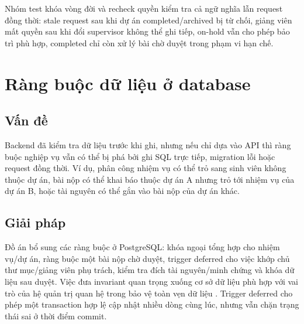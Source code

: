 Nhóm test khóa vòng đời và recheck quyền kiểm tra cả ngữ nghĩa lẫn request đồng thời: stale request sau khi dự án completed/archived bị từ chối, giảng viên mất quyền sau khi đổi supervisor không thể ghi tiếp, on-hold vẫn cho phép bảo trì phù hợp, completed chỉ còn xử lý bài chờ duyệt trong phạm vi hạn chế.

\section{Ràng buộc dữ liệu ở database}

\subsection{Vấn đề}

Backend đã kiểm tra dữ liệu trước khi ghi, nhưng nếu chỉ dựa vào API thì ràng buộc nghiệp vụ vẫn có thể bị phá bởi ghi SQL trực tiếp, migration lỗi hoặc request đồng thời. Ví dụ, phân công nhiệm vụ có thể trỏ sang sinh viên không thuộc dự án, bài nộp có thể khai báo thuộc dự án A nhưng trỏ tới nhiệm vụ của dự án B, hoặc tài nguyên có thể gắn vào bài nộp của dự án khác.

\subsection{Giải pháp}

Đồ án bổ sung các ràng buộc ở PostgreSQL: khóa ngoại tổng hợp cho nhiệm vụ/dự án, ràng buộc một bài nộp chờ duyệt, trigger deferred cho việc khớp chủ thư mục/giảng viên phụ trách, kiểm tra đích tài nguyên/minh chứng và khóa dữ liệu sau duyệt. Việc đưa invariant quan trọng xuống cơ sở dữ liệu phù hợp với vai trò của hệ quản trị quan hệ trong bảo vệ toàn vẹn dữ liệu \cite{silberschatz2020database}. Trigger deferred cho phép một transaction hợp lệ cập nhật nhiều dòng cùng lúc, nhưng vẫn chặn trạng thái sai ở thời điểm commit.

